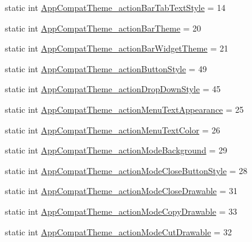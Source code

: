 \begin{DoxyCompactItemize}
\item 
static int \hyperlink{classandroid_1_1support_1_1v7_1_1cardview_1_1R_1_1styleable_a918e33615d661042e8d857f74c194f01}{App\+Compat\+Theme\+\_\+action\+Bar\+Tab\+Text\+Style} = 14
\item 
static int \hyperlink{classandroid_1_1support_1_1v7_1_1cardview_1_1R_1_1styleable_a0afa910c9139ab9dc1ed8bf0bde0fb30}{App\+Compat\+Theme\+\_\+action\+Bar\+Theme} = 20
\item 
static int \hyperlink{classandroid_1_1support_1_1v7_1_1cardview_1_1R_1_1styleable_a3c5e0815c1f2e11931d5751bdea83e88}{App\+Compat\+Theme\+\_\+action\+Bar\+Widget\+Theme} = 21
\item 
static int \hyperlink{classandroid_1_1support_1_1v7_1_1cardview_1_1R_1_1styleable_aaa6dcc1366883a5cd43e6dee5173fcaf}{App\+Compat\+Theme\+\_\+action\+Button\+Style} = 49
\item 
static int \hyperlink{classandroid_1_1support_1_1v7_1_1cardview_1_1R_1_1styleable_a56b8b8128966a67324fa382f40a941e8}{App\+Compat\+Theme\+\_\+action\+Drop\+Down\+Style} = 45
\item 
static int \hyperlink{classandroid_1_1support_1_1v7_1_1cardview_1_1R_1_1styleable_af99c77056c4366c7634c36bb75ea3709}{App\+Compat\+Theme\+\_\+action\+Menu\+Text\+Appearance} = 25
\item 
static int \hyperlink{classandroid_1_1support_1_1v7_1_1cardview_1_1R_1_1styleable_aba0a97a0706db940133aa5927746c78f}{App\+Compat\+Theme\+\_\+action\+Menu\+Text\+Color} = 26
\item 
static int \hyperlink{classandroid_1_1support_1_1v7_1_1cardview_1_1R_1_1styleable_a3daccfb428ba25d01af0a76d23f50715}{App\+Compat\+Theme\+\_\+action\+Mode\+Background} = 29
\item 
static int \hyperlink{classandroid_1_1support_1_1v7_1_1cardview_1_1R_1_1styleable_a2a8f512e4939be1532337d4efd1ab3cd}{App\+Compat\+Theme\+\_\+action\+Mode\+Close\+Button\+Style} = 28
\item 
static int \hyperlink{classandroid_1_1support_1_1v7_1_1cardview_1_1R_1_1styleable_a9587a4674c7e1d0eabdd8e93770ef690}{App\+Compat\+Theme\+\_\+action\+Mode\+Close\+Drawable} = 31
\item 
static int \hyperlink{classandroid_1_1support_1_1v7_1_1cardview_1_1R_1_1styleable_ab9c8337b10dc73ac0b10a666f25230bb}{App\+Compat\+Theme\+\_\+action\+Mode\+Copy\+Drawable} = 33
\item 
static int \hyperlink{classandroid_1_1support_1_1v7_1_1cardview_1_1R_1_1styleable_a92e60896480e5eb8639971dc11df7943}{App\+Compat\+Theme\+\_\+action\+Mode\+Cut\+Drawable} = 32

\end{DoxyCompactItemize}
